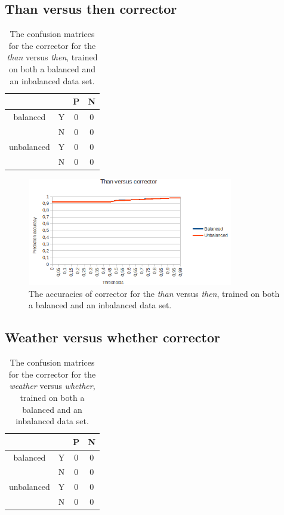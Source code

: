 \documentclass[12pt]{article}
\begin{document}
\subsection{Than versus then corrector}

\begin{table}[H] \footnotesize
\centering
\begin{tabular}{|c|c|c|c|}
\hline
&&P&N\\
\hline
balanced&Y&0&0\\
&N&0&0\\
\hline
\hline
unbalanced&Y&0&0\\
&N&0&0\\
\hline
\end{tabular}
\caption{The confusion matrices for the corrector for the \emph{than} versus \emph{then}, trained on both a balanced and an inbalanced data set.}
\end{table}

\begin{figure}[H]
\centering
\includegraphics[width=0.8\textwidth]{accuracy_thanthen.png}
\caption{The accuracies of corrector for the \emph{than} versus \emph{then}, trained on both a balanced and an inbalanced data set.}
\end{figure}

\subsection{Weather versus whether corrector}

\begin{table}[H] \footnotesize
\centering
\begin{tabular}{|c|c|c|c|}
\hline
&&P&N\\
\hline
balanced&Y&0&0\\
&N&0&0\\
\hline
\hline
unbalanced&Y&0&0\\
&N&0&0\\
\hline
\end{tabular}
\caption{The confusion matrices for the corrector for the \emph{weather} versus \emph{whether}, trained on both a balanced and an inbalanced data set.}
\end{table}
\end{document}
